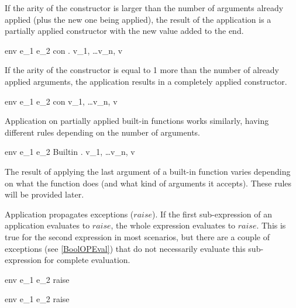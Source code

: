 \documentclass{article}
\begin{document}
If the arity of the constructor is larger than the number of arguments already applied (plus the new one being applied), the result of the application is a partially applied constructor with the new value added to the end.

    {\mbox{env} \vdash e_1 \; e_2 \Downarrow \ll con \; . \; v_1, \; \dots v_n, \; v \gg}

If the arity of the constructor is equal to 1 more than the number of already applied arguments, the application results in a completely applied constructor.

    {\mbox{env} \vdash e_1 \; e_2 \Downarrow con \; v_1, \; \dots v_n, \; v}

\medskip

Application on partially applied built-in functions works similarly, having different rules depending on the number of arguments.

    {\mbox{env} \vdash e_1 \; e_2 \Downarrow \ll Builtin \; . \; v_1, \; \dots v_n, \; v \gg}

The result of applying the last argument of a built-in function varies depending on what the function does (and what kind of arguments it accepts).
These rules will be provided later.

\medskip

Application propagates exceptions ($raise$).
If the first sub-expression of an application evaluates to $raise$, the whole expression evaluates to $raise$.
This is true for the second expression in most scenarios, but there are a couple of exceptions (see \ref{BoolOPEval}) that do not necessarily evaluate this sub-expression for complete evaluation.

    {\mbox{env} \vdash e_1 \; e_2 \Downarrow raise}

    {\mbox{env} \vdash e_1 \; e_2 \Downarrow raise}
\end{document}
